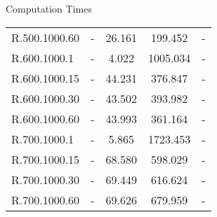 \documentclass{beamer}
\begin{document}
\begin{frame}{Computation Times}
{\begin{tabular}{lcccc}
			R.500.1000.60 & -              & 26.161        & 199.452     & -             \\
			R.600.1000.1  & -              & 4.022         & 1005.034    & -             \\
			R.600.1000.15 & -              & 44.231        & 376.847     & -             \\
			R.600.1000.30 & -              & 43.502        & 393.982     & -             \\
			R.600.1000.60 & -              & 43.993        & 361.164     & -             \\
			R.700.1000.1  & -              & 5.865         & 1723.453    & -             \\
			R.700.1000.15 & -              & 68.580        & 598.029     & -             \\
			R.700.1000.30 & -              & 69.449        & 616.624     & -             \\
			R.700.1000.60 & -              & 69.626        & 679.959     & -             \\
		\end{tabular}

}

\end{frame}
\end{document}
